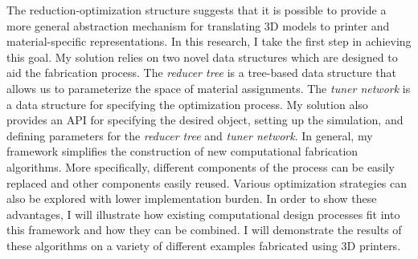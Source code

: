 The reduction-optimization structure suggests that it is possible to provide a more general abstraction mechanism for translating 3D models to printer and material-specific representations. In this research, I take the first step in achieving this goal. My solution relies on two novel data structures which are designed to aid the fabrication process. The \emph{reducer tree} is a tree-based data structure that allows us to parameterize the space of material assignments. The \emph{tuner network} is a data structure for specifying the optimization process.
My solution also provides an API for specifying the desired object, setting up the simulation, and defining parameters for the \emph{reducer tree} and \emph{tuner network}.
In general, my framework simplifies the construction of new computational fabrication algorithms.
More specifically, different components of the process can be easily replaced and other components easily reused. 
Various optimization strategies can also be explored with lower implementation burden. In order to show these advantages, I will illustrate how existing computational design processes fit into this framework and how they can be combined.
I will demonstrate the results of these algorithms on a variety of different examples fabricated using 3D printers.
